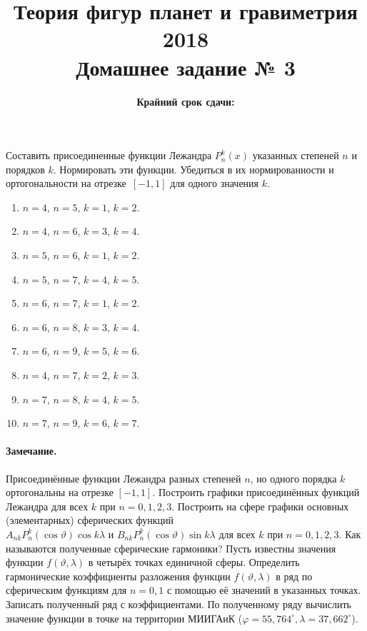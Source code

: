 \documentclass[11pt, a4paper,addpoints]{exam}
\title{{\Large Теория фигур планет и гравиметрия 2018}\\ 
    {\bf\Large Домашнее задание № 3}}
\author{}
\date{\normalsize\bf Крайний срок сдачи: \DTMusedate{deadline}}
\theoremstyle{remark}
\renewcommand{\phi}{\ensuremath{\varphi}}
\renewcommand{\theta}{\vartheta}
\begin{document}
\maketitle
\thispagestyle{empty}
\begin{questions}
    \question[2] Составить присоединенные функции Лежандра $P_n^k \left( x \right)$ указанных
    степеней $n$ и порядков $k$. Нормировать эти функции. Убедиться в их нормированности и
    ортогональности на отрезке~$\left[-1, 1 \right]$ для одного значения $k$.
    \begin{enumerate}
        \item $n = 4$, $n = 5$, $k = 1$, $k = 2$.
        \item $n = 4$, $n = 6$, $k = 3$, $k = 4$.
        \item $n = 5$, $n = 6$, $k = 1$, $k = 2$.
        \item $n = 5$, $n = 7$, $k = 4$, $k = 5$.
        \item $n = 6$, $n = 7$, $k = 1$, $k = 2$.
        \item $n = 6$, $n = 8$, $k = 3$, $k = 4$.
        \item $n = 6$, $n = 9$, $k = 5$, $k = 6$.
        \item $n = 4$, $n = 7$, $k = 2$, $k = 3$.
        \item $n = 7$, $n = 8$, $k = 4$, $k = 5$.
        \item $n = 7$, $n = 9$, $k = 6$, $k = 7$.
    \end{enumerate}
    \paragraph{Замечание.} Присоединённые функции Лежандра разных степеней $n$, но одного порядка
    $k$ ортогональны на отрезке $\left[ -1, 1 \right]$.
    \question[1] Построить графики присоединённых функций Лежандра для всех $k$ при $n = 0, 1, 2, 3$.
    \question[1] Построить на сфере графики основных (элементарных) сферических функций \\ $A_{nk} P_n^k \left( \cos{\theta} \right)\cos{k\lambda}$ и
    $B_{nk} P_n^k \left( \cos{\theta} \right)\sin{k\lambda}$ для всех $k$ при $n = 0, 1, 2, 3$.
    Как называются полученные сферические гармоники?
    \question[2] Пусть известны значения функции $f\left( \theta, \lambda \right)$ в четырёх точках единичной сферы. 
    Определить гармонические коэффициенты разложения функции $f\left( \theta, \lambda \right)$ в ряд
    по сферическим функциям для $n=0, 1$ с помощью её значений в указанных точках. Записать
    полученный ряд с коэффициентами. По полученному ряду вычислить значение функции в точке
    на территории МИИГАиК ($\phi=55,764^\circ, \lambda=37,662^\circ$).
    \end{questions}
\end{document}
